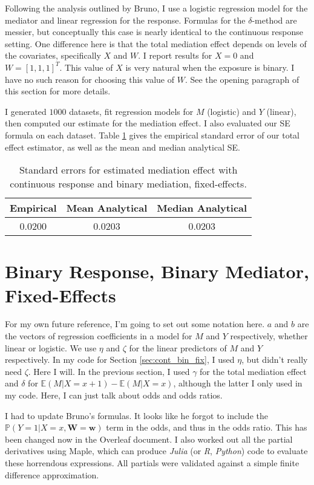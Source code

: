 \documentclass{article}
\newcommand{\bP}{\mathbb{P}}
\newcommand{\bE}{\mathbb{E}}
\begin{document}
Following the analysis outlined by Bruno, I use a logistic regression model for the mediator and linear regression for the response. Formulas for the $\delta$-method are messier, but conceptually this case is nearly identical to the continuous response setting. One difference here is that the total mediation effect depends on levels of the covariates, specifically $X$ and $W$. I report results for $X=0$ and $W = [1,1,1]^T$. This value of $X$ is very natural when the exposure is binary. I have no such reason for choosing this value of $W$. See the opening paragraph of this section for more details.

I generated $1000$ datasets, fit regression models for $M$ (logistic) and $Y$ (linear), then computed our estimate for the mediation effect. I also evaluated our SE formula on each dataset. Table \ref{tab:SEs_cont_bin_fix} gives the empirical standard error of our total effect estimator, as well as the mean and median analytical SE.

\begin{table}
    \centering
    \begin{tabular}{|c|c|c|}
        \hline
        Empirical & Mean Analytical & Median Analytical\\
        \hline
        0.0200 & 0.0203 & 0.0203\\
        \hline
    \end{tabular}
    \caption{Standard errors for estimated mediation effect with continuous response and binary mediation, fixed-effects.}
    \label{tab:SEs_cont_bin_fix}
\end{table}


\section{Binary Response, Binary Mediator, Fixed-Effects}

For my own future reference, I'm going to set out some notation here. $a$ and $b$ are the vectors of regression coefficients in a model for $M$ and $Y$ respectively, whether linear or logistic. We use $\eta$ and $\zeta$ for the linear predictors of $M$ and $Y$ respectively. In my code for Section \ref{sec:cont_bin_fix}, I used $\eta$, but didn't really need $\zeta$. Here I will. In the previous section, I used $\gamma$ for the total mediation effect and $\delta$ for $\bE(M | X=x+1) - \bE(M | X=x)$, although the latter I only used in my code. Here, I can just talk about odds and odds ratios.

I had to update Bruno's formulas. It looks like he forgot to include the $\bP(Y=1 | X=x, \mathbf{W}=\mathbf{w})$ term in the odds, and thus in the odds ratio. This has been changed now in the Overleaf document. I also worked out all the partial derivatives using Maple, which can produce \textit{Julia} (or \textit{R}, \textit{Python}) code to evaluate these horrendous expressions. All partials were validated against a simple finite difference approximation.
\end{document}
